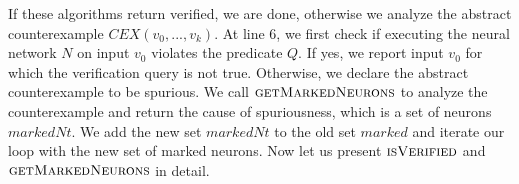 If these algorithms return verified, we are done, otherwise we analyze the abstract counterexample $CEX(v_0,...,v_k)$.
At line 6, we first check if executing the neural network $N$ on input $v_0$
violates the predicate $Q$.
If yes, we report input $v_0$ for which the verification query is not true.
Otherwise, we declare the abstract counterexample to be spurious.
We call $\textsc{getMarkedNeurons}$ to analyze the counterexample and
return the cause of spuriousness, which is a set of neurons $markedNt$.
We add the new set $markedNt$ to the old set $marked$ and iterate our loop with the new set of marked neurons. Now let us present $\textsc{isVerified}$ and $\textsc{getMarkedNeurons}$ in detail.


%















